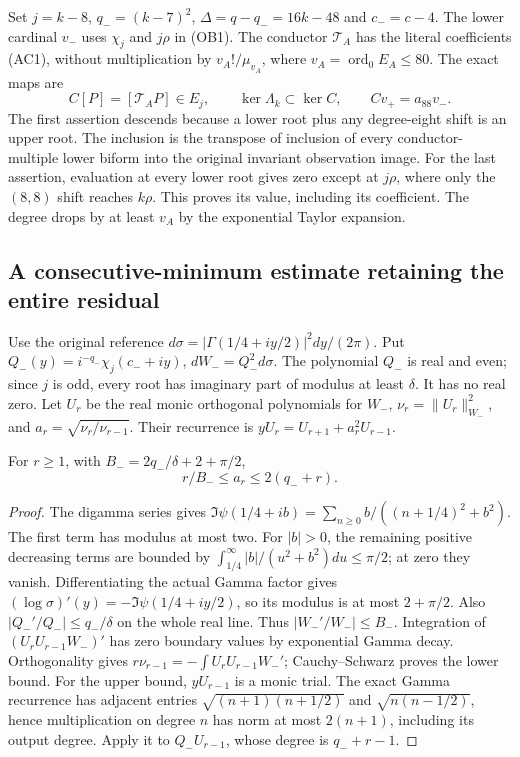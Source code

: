 Set $j=k-8$, $q_-=(k-7)^2$, $\Delta=q-q_-=16k-48$ and $c_-=c-4$.
The lower cardinal $v_-$ uses $\chi_j$ and $j\rho$ in (OB1).
The conductor $\mathcal T_A$ has the literal coefficients (AC1),
without multiplication by $v_A!/\mu_{v_A}$, where
$v_A=\operatorname{ord}_0E_A\le80$. The exact maps are
\[
 C[P]=[\mathcal T_AP]\in E_j,\qquad
 \ker\Lambda_k\subset\ker C,\qquad Cv_+=a_{88}v_- .\tag{OB3}
\]
The first assertion descends because a lower root plus any degree-eight
shift is an upper root. The inclusion is the transpose of inclusion
of every conductor-multiple lower biform into the original invariant
observation image. For the last assertion, evaluation at every lower
root gives zero except at $j\rho$, where only the $(8,8)$ shift
reaches $k\rho$. This proves its value, including its coefficient.
The degree drops by at least $v_A$ by the exponential Taylor expansion.

\subsection{A consecutive-minimum estimate retaining the entire residual}
Use the original reference $d\sigma=|\Gamma(1/4+iy/2)|^2dy/(2\pi)$.
Put $Q_-(y)=i^{-q_-}\chi_j(c_-+iy)$, $dW_-=Q_-^2d\sigma$.
The polynomial $Q_-$ is real and even; since $j$ is odd, every root
has imaginary part of modulus at least $\delta$. It has no real zero.
Let $U_r$ be the real monic orthogonal polynomials for $W_-$,
$\nu_r=\|U_r\|_{W_-}^2$, and $a_r=\sqrt{\nu_r/\nu_{r-1}}$.
Their recurrence is $yU_r=U_{r+1}+a_r^2U_{r-1}$.

\begin{hzoclemma}
For $r\ge1$, with $B_-=2q_-/\delta+2+\pi/2$,
\[
 r/B_-\le a_r\le2(q_-+r).\tag{OB4}
\]
\end{hzoclemma}
\begin{proof}
The digamma series \cite[5.7.6]{hzoc:DLMF5} gives
$\Im\psi(1/4+ib)=\sum_{n\ge0}b/((n+1/4)^2+b^2)$.
The first term has modulus at most two. For $|b|>0$, the remaining
positive decreasing terms are bounded by
$\int_{1/4}^\infty |b|/(u^2+b^2)du\le\pi/2$; at zero they vanish.
Differentiating the actual Gamma factor gives
$(\log\sigma)'(y)=-\Im\psi(1/4+iy/2)$, so its modulus is at most
$2+\pi/2$. Also $|Q_-'/Q_-|\le q_-/\delta$ on the whole real line.
Thus $|W_-'/W_-|\le B_-$. Integration of
$(U_rU_{r-1}W_-)'$ has zero boundary values by exponential Gamma
decay. Orthogonality gives
$r\nu_{r-1}=-\int U_rU_{r-1}W_-'$; Cauchy--Schwarz proves the
lower bound. For the upper bound, $yU_{r-1}$ is a monic trial.
The exact Gamma recurrence has adjacent entries
$\sqrt{(n+1)(n+1/2)}$ and $\sqrt{n(n-1/2)}$, hence multiplication
on degree $n$ has norm at most $2(n+1)$, including its output degree.
Apply it to $Q_-U_{r-1}$, whose degree is $q_-+r-1$.
\end{proof}

